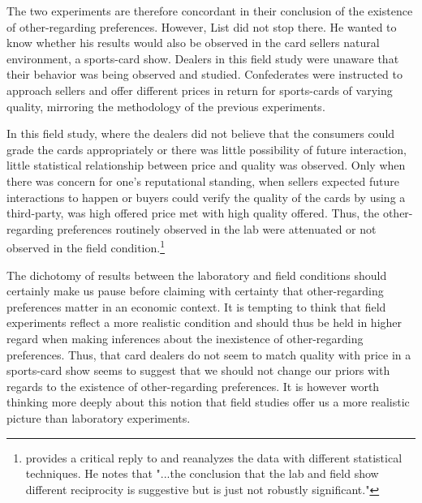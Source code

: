 \documentclass[12pt]{article}
\begin{document}
The two experiments are therefore concordant in their conclusion of the existence of other-regarding preferences. However, List did not stop there. He wanted to know whether his results would also be observed in the card sellers natural environment, a sports-card show. Dealers in this field study were unaware that their behavior was being observed and studied. Confederates were instructed to approach sellers and offer different prices in return for sports-cards of varying quality, mirroring the methodology of the previous experiments. 

In this field study, where the dealers did not believe that the consumers could grade the cards appropriately or there was little possibility of future interaction, little statistical relationship between price and quality was observed. Only when there was concern for one's reputational standing, when sellers expected future interactions to happen or buyers could verify the quality of the cards by using a third-party, was high offered price met with high quality offered. Thus, the other-regarding preferences routinely observed in the lab were attenuated or not observed in the field condition.\footnote{\cite{camerer2011promise} provides a critical reply to \cite{List2006} and reanalyzes the data with different statistical techniques. He notes that "...the conclusion that the lab and field show different reciprocity is suggestive but is just not robustly significant."}

The dichotomy of results between the laboratory and field conditions should certainly make us pause before claiming with certainty that other-regarding preferences matter in an economic context. It is tempting to think that field experiments reflect a more realistic condition and should thus be held in higher regard when making inferences about the inexistence of other-regarding preferences. Thus, that card dealers do not seem to match quality with price in a sports-card show seems to suggest that we should not change our priors with regards to the existence of other-regarding preferences. It is however worth thinking more deeply about this notion that field studies offer us a more realistic picture than laboratory experiments.
\end{document}

